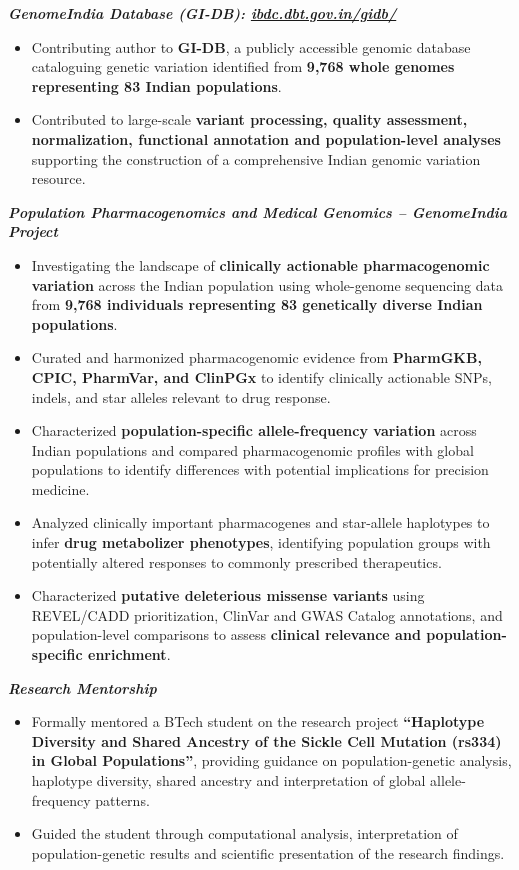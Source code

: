\documentclass[10pt,a4paper]{article}
\newcommand{\project}[1]{
    \noindent\textbf{\textit{#1}}\vspace{0.1em}\par
}
\begin{document}
\project{GenomeIndia Database (GI-DB): \href{https://ibdc.dbt.gov.in/gidb/}{ibdc.dbt.gov.in/gidb/}}
\begin{itemize}
\item Contributing author to \textbf{GI-DB}, a publicly accessible genomic database cataloguing genetic variation identified from \textbf{9,768 whole genomes representing 83 Indian populations}.
\item Contributed to large-scale \textbf{variant processing, quality assessment, normalization, functional annotation and population-level analyses} supporting the construction of a comprehensive Indian genomic variation resource.
\end{itemize}

\project{Population Pharmacogenomics and Medical Genomics -- GenomeIndia Project}
\begin{itemize}
\item Investigating the landscape of \textbf{clinically actionable pharmacogenomic variation} across the Indian population using whole-genome sequencing data from \textbf{9,768 individuals representing 83 genetically diverse Indian populations}.
\item Curated and harmonized pharmacogenomic evidence from \textbf{PharmGKB, CPIC, PharmVar, and ClinPGx} to identify clinically actionable SNPs, indels, and star alleles relevant to drug response.
\item Characterized \textbf{population-specific allele-frequency variation} across Indian populations and compared pharmacogenomic profiles with global populations to identify differences with potential implications for precision medicine.
\item Analyzed clinically important pharmacogenes and star-allele haplotypes to infer \textbf{drug metabolizer phenotypes}, identifying population groups with potentially altered responses to commonly prescribed therapeutics.
\item Characterized \textbf{putative deleterious missense variants} using REVEL/CADD prioritization, ClinVar and GWAS Catalog annotations, and population-level comparisons to assess \textbf{clinical relevance and population-specific enrichment}.
\end{itemize}

\newpage
\project{Research Mentorship}
\begin{itemize}
\item Formally mentored a BTech student on the research project \textbf{``Haplotype Diversity and Shared Ancestry of the Sickle Cell Mutation (rs334) in Global Populations''}, providing guidance on population-genetic analysis, haplotype diversity, shared ancestry and interpretation of global allele-frequency patterns.
\item Guided the student through computational analysis, interpretation of population-genetic results and scientific presentation of the research findings.
\end{itemize}
\end{document}
